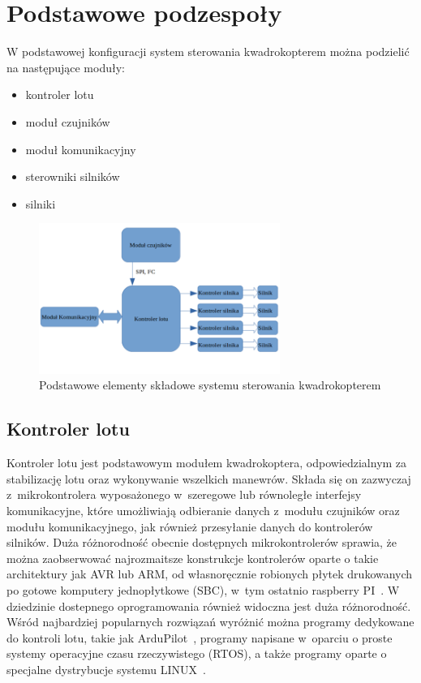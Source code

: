 \section{Podstawowe podzespoły}

W podstawowej konfiguracji system sterowania kwadrokopterem można podzielić na następujące moduły:
\begin{itemize}
	\item{kontroler lotu}
	\item{moduł czujników}
	\item{moduł komunikacyjny}
	\item{sterowniki silników}
	\item{silniki}
\end{itemize}

\begin{figure}[H]
	\centering
		\includegraphics[width=0.7\textwidth]{Pictures/quadrotor_modules.png}
	\caption[Podstawowe moduły kwawdrokoptera]{Podstawowe elementy składowe systemu sterowania kwadrokopterem}
	\label{fig:quadrotor_modules.png}
\end{figure}

\subsection{Kontroler lotu}

Kontroler lotu jest podstawowym modułem kwadrokoptera, odpowiedzialnym za stabilizację lotu oraz wykonywanie wszelkich manewrów. Składa się on zazwyczaj z~mikrokontrolera wyposażonego w~szeregowe lub równoległe interfejsy komunikacyjne, które umożliwiają odbieranie danych z~modułu czujników oraz modułu komunikacyjnego, jak również przesyłanie danych do kontrolerów silników. Duża różnorodność obecnie dostępnych mikrokontrolerów sprawia, że można zaobserwować najrozmaitsze konstrukcje kontrolerów oparte o takie architektury jak AVR lub ARM, od własnoręcznie robionych płytek drukowanych po gotowe komputery jednopłytkowe (SBC), w~tym ostatnio raspberry PI~\cite{quadro12, quadro13}. W dziedzinie dostepnego oprogramowania również widoczna jest duża różnorodność. Wśród najbardziej popularnych rozwiązań wyróżnić można programy dedykowane do kontroli lotu, takie jak ArduPilot~\cite{quadro14}, programy napisane w~oparciu o proste systemy operacyjne czasu rzeczywistego (RTOS), a także programy oparte o specjalne dystrybucje systemu LINUX~\cite{quadro15}.

